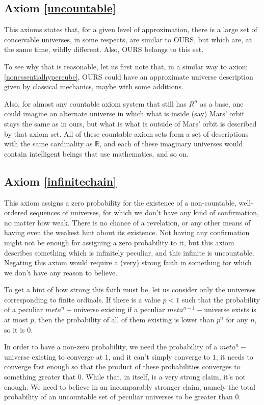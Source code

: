 \documentclass[a4paper
,draft
]{article}
\def\reale{\mathbb{R}}
\begin{document}
\subsection{Axiom \ref{uncountable}}

This axioms states that, for a given level of approximation, there is a large set of conceivable universes, in some respects, are similar to OURS, but which are, at the same time, wildly different. Also, OURS belongs to this set.

To see why that is reasonable, let us first note that, in a similar way to axiom \ref{nonessentialhypercube}, OURS could have an approximate universe description given by classical mechanics, maybe with some additions.

Also, for almost any countable axiom system that still has $R^n$ as a base, one could imagine an alternate universe in which what is inside (say) Mars' orbit stays the same as in ours, but what is what is outside of Mars' orbit is described by that axiom set. All of these countable axiom sets form a set of descriptions with the same cardinality as $\reale$, and each of these imaginary universes would contain intelligent beings that use mathematics, and so on.

\subsection{Axiom \ref{infinitechain}}

This axiom assigns a zero probability for the existence of a non-countable, well-ordered sequences of universes, for which we don't have any kind of confirmation, no matter how weak. There is no chance of a revelation, or any other means of having even the weakest hint about its existence. Not having any confirmation might not be enough for assigning a zero probability to it, but this axiom describes something which is infinitely peculiar, and this infinite is uncountable. Negating this axiom would require a (very) strong faith in something for which we don't have any reason to believe.

To get a hint of how strong this faith must be, let us consider only the universes corresponding to finite ordinals. If there is a value $p < 1$ such that the probability of a peculiar $meta^n-$universe existing if a peculiar $meta^{n-1}-$universe exists is at most $p$, then the probability of all of them existing is lower than $p^n$ for any $n$, so it is $0$.

In order to have a non-zero probability, we need the probability of a $meta^n-$universe existing to converge at $1$, and it can't simply converge to $1$, it needs to converge fast enough so that the product of these probabilities converges to something greater that $0$. While that, in itself, is a very strong claim, it's not enough. We need to believe in an incomparably stronger claim, namely the total probability of an uncountable set of peculiar universes to be greater than $0$.
\end{document}
